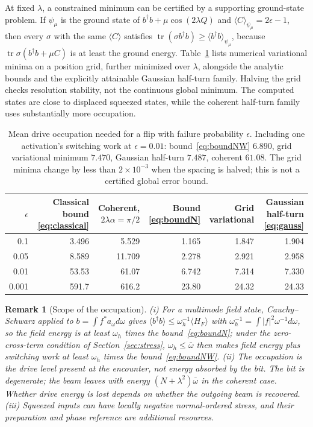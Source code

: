 \documentclass[aps,pre,onecolumn,superscriptaddress,floatfix,longbibliography]{revtex4-2}
\newtheorem{remark}[theorem]{Remark}
\begin{document}
At fixed $\lambda$, a constrained minimum can be certified by a supporting ground-state problem. If $\psi_\mu$ is the ground state of $b^\dagger b+\mu\cos(2\lambda Q)$ and $\langle C\rangle_{\psi_\mu}=2\epsilon-1$, then every $\sigma$ with the same $\langle C\rangle$ satisfies $\operatorname{tr}(\sigma b^\dagger b)\ge\langle b^\dagger b\rangle_{\psi_\mu}$, because $\operatorname{tr}\sigma(b^\dagger b+\mu C)$ is at least the ground energy. Table~\ref{tab:energy} lists numerical variational minima on a position grid, further minimized over $\lambda$, alongside the analytic bounds and the explicitly attainable Gaussian half-turn family. Halving the grid checks resolution stability, not the continuous global minimum. The computed states are close to displaced squeezed states, while the coherent half-turn family uses substantially more occupation.

\begin{table}[h]
\centering
\begin{tabular}{@{}rrrrrr@{}}
\toprule
$\epsilon$ & Classical bound \eqref{eq:classical} & Coherent, $2\lambda\alpha=\pi/2$ & Bound \eqref{eq:boundN} & Grid variational & Gaussian half-turn \eqref{eq:gauss}\\
\midrule
0.1 & 3.496 & 5.529 & 1.165 & 1.847 & 1.904\\
0.05 & 8.589 & 11.709 & 2.278 & 2.921 & 2.958\\
0.01 & 53.53 & 61.07 & 6.742 & 7.314 & 7.330\\
0.001 & 591.7 & 616.2 & 23.80 & 24.32 & 24.33\\
\bottomrule
\end{tabular}
\caption{Mean drive occupation needed for a flip with failure probability $\epsilon$. Including one activation's switching work at $\epsilon=0.01$: bound~\eqref{eq:boundNW} $6.890$, grid variational minimum $7.470$, Gaussian half-turn $7.487$, coherent $61.08$. The grid minima change by less than $2\times10^{-3}$ when the spacing is halved; this is not a certified global error bound.}
\label{tab:energy}
\end{table}

\begin{remark}[Scope of the occupation]
\label{rem:occupation}
(i) For a multimode field state, Cauchy--Schwarz applied to $b=\int f^*a_\omega d\omega$ gives $\langle b^\dagger b\rangle\le\omega_h^{-1}\langle H_F\rangle$ with $\omega_h^{-1}=\int|f|^2\omega^{-1}d\omega$, so the field energy is at least $\omega_h$ times the bound~\eqref{eq:boundN}; under the zero-cross-term condition of Section~\ref{sec:stress}, $\omega_h\le\bar\omega$ then makes field energy plus switching work at least $\omega_h$ times the bound~\eqref{eq:boundNW}. (ii) The occupation is the drive level present at the encounter, not energy absorbed by the bit. The bit is degenerate; the beam leaves with energy $(N+\lambda^2)\bar\omega$ in the coherent case. Whether drive energy is lost depends on whether the outgoing beam is recovered. (iii) Squeezed inputs can have locally negative normal-ordered stress, and their preparation and phase reference are additional resources.
\end{remark}
\end{document}
